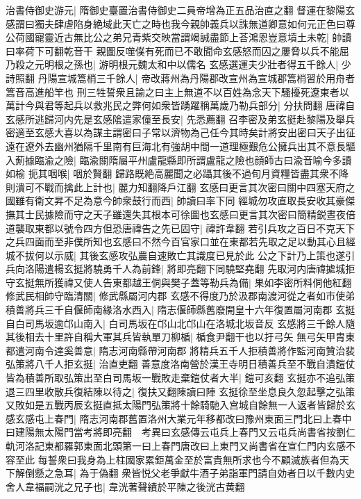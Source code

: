 治書侍御史游元|{
	隋御史臺置治書侍御史二員帝增為正五品治直之翻}
督運在黎陽玄感謂曰獨夫肆虐陷身絶域此天亡之時也我今親帥義兵以誅無道卿意如何元正色曰尊公荷國寵靈近古無比公之弟兄青紫交映當謂竭誠盡節上荅鴻恩豈意墳土未乾|{
	帥讀曰率荷下可翻乾音干}
親圖反噬僕有死而已不敢聞命玄感怒而囚之屢脅以兵不能屈乃殺之元明根之孫也|{
	游明根元魏太和中以儒名}
玄感選運夫少壯者得五千餘人|{
	少詩照翻}
丹陽宣城篙梢三千餘人|{
	帝改蔣州為丹陽郡改宣州為宣城郡篙梢習於用舟者篙音高進船竿也}
刑三牲誓衆且諭之曰主上無道不以百姓為念天下騷擾死遼東者以萬計今與君等起兵以救兆民之弊何如衆皆踴躍稱萬歲乃勒兵部分|{
	分扶問翻}
唐禕自玄感所逃歸河内先是玄感隂遣家僮至長安|{
	先悉薦翻}
召李密及弟玄挺赴黎陽及舉兵密適至玄感大喜以為謀主謂密曰子常以濟物為己任今其時矣計將安出密曰天子出征遠在遼外去幽州猶隔千里南有巨海北有強胡中間一道理極艱危公擁兵出其不意長驅入薊據臨渝之險|{
	臨渝關隋屬平州盧龍縣即所謂盧龍之險也顔師古曰渝音喻今多讀如榆}
扼其咽喉|{
	咽於賢翻}
歸路既絶高麗聞之必躡其後不過旬月資糧皆盡其衆不降則潰可不戰而擒此上計也|{
	麗力知翻降戶江翻}
玄感曰更言其次密曰關中四塞天府之國雖有衛文昇不足為意今帥衆鼓行而西|{
	帥讀曰率下同}
經城勿攻直取長安收其豪傑撫其士民據險而守之天子雖還失其根本可徐圖也玄感曰更言其次密曰簡精鋭晝夜倍道襲取東都以號令四方但恐唐禕告之先已固守|{
	禕許韋翻}
若引兵攻之百日不克天下之兵四面而至非僕所知也玄感曰不然今百官家口並在東都若先取之足以動其心且經城不拔何以示威|{
	其後玄感攻弘農自速敗亡其識度已見於此}
公之下計乃上策也遂引兵向洛陽遣楊玄挺將驍勇千人為前鋒|{
	將即亮翻下同驍堅堯翻}
先取河内唐禕㨿城拒守玄挺無所獲禕又使人告東都越王侗與樊子蓋等勒兵為備|{
	果如李密所料侗他紅翻}
修武民相帥守臨清關|{
	修武縣屬河内郡}
玄感不得度乃於汲郡南渡河從之者如市使弟積善將兵三千自偃師南緣洛水西入|{
	隋志偃師縣舊廢開皇十六年復置屬河南郡}
玄挺自白司馬坂逾邙山南入|{
	白司馬坂在邙山北邙山在洛城北坂音反}
玄感將三千餘人隨其後相去十里許自稱大軍其兵皆執單刀柳楯|{
	楯食尹翻干也以扜弓矢}
無弓矢甲胄東都遣河南令達奚善意|{
	隋志河南縣帶河南郡}
將精兵五千人拒積善將作監河南贊治裴弘策將八千人拒玄挺|{
	治直吏翻}
善意度洛南營於漢王寺明日積善兵至不戰自潰鎧仗皆為積善所取弘策出至白司馬坂一戰敗走棄鎧仗者大半|{
	鎧可亥翻}
玄挺亦不追弘策退三四里收散兵復結陳以待之|{
	復扶又翻陳讀曰陣}
玄挺徐至坐息良久忽起擊之弘策又敗如是五戰丙辰玄挺直抵太陽門弘策將十餘騎馳入宫城自餘無一人返者皆歸於玄感玄感屯上春門|{
	隋志河南郡舊置洛州大業元年移都改曰豫州東面三門北曰上春中曰建陽無太陽門當考將即亮翻　考異曰玄感傳云屯兵上春門又云屯兵尚書省按劉仁軌河洛記東都羅郭東面北頭第一曰上春門唐改曰上東門又尚書省在宣仁門内玄感不容至此}
每誓衆曰我身為上柱國家累鉅萬金至於富貴無所求也今不顧滅族者但為天下解倒懸之急耳|{
	為于偽翻}
衆皆悦父老爭獻牛酒子弟詣軍門請自効者日以千數内史舍人韋福嗣洸之兄子也|{
	韋洸著聲績於平陳之後洸古黄翻}
